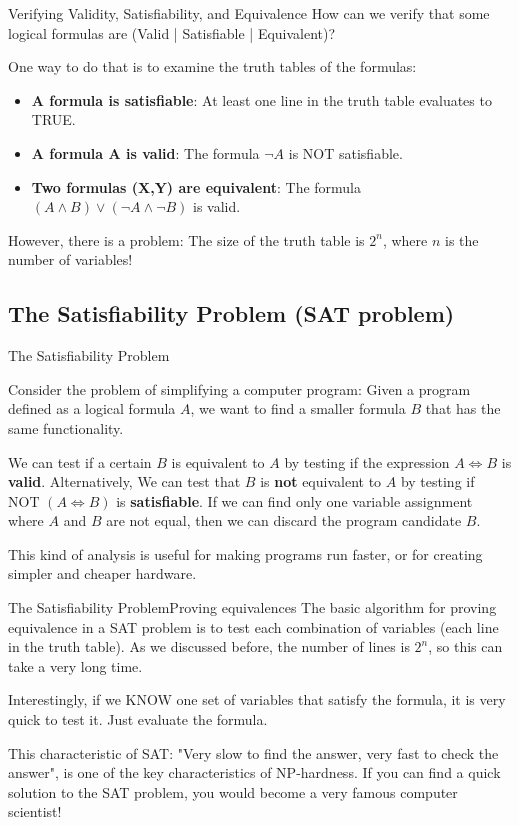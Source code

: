 \begin{frame}[t]{Verifying Validity, Satisfiability, and Equivalence}
  How can we verify that some logical formulas are (Valid | Satisfiable | Equivalent)?\bigskip 

  One way to do that is to examine the truth tables of the formulas:

  \begin{itemize}
    \item {\bf A formula is satisfiable}: At least one line in the truth table evaluates to TRUE.
    \item {\bf A formula A is valid}: The formula $\lnot{A}$ is NOT satisfiable.
    \item {\bf Two formulas (X,Y) are equivalent}: The formula $(A \land B) \lor (\lnot{A}\land\lnot{B})$ is valid.
  \end{itemize}\bigskip

  However, there is a problem: The size of the truth table is $2^n$, where $n$ is the number of variables!
\end{frame}


\subsection{The Satisfiability Problem (SAT problem)}

\begin{frame}{The Satisfiability Problem}

  Consider the problem of simplifying a computer program: Given a program defined as a logical formula $A$, we want to find a smaller formula $B$ that has the same functionality.\vfill

  We can test if a certain $B$ is equivalent to $A$ by testing if the expression $A \iff B$ is {\bf valid}. Alternatively, We can test that $B$ is {\bf not} equivalent to $A$ by testing if $\text{NOT }(A \iff B)$ is {\bf satisfiable}. If we can find only one variable assignment where $A$ and $B$ are not equal, then we can discard the program candidate $B$.\vfill

  This kind of analysis is useful for making programs run faster, or for creating simpler and cheaper hardware.
\end{frame}

\begin{frame}{The Satisfiability Problem}{Proving equivalences}
  The basic algorithm for proving equivalence in a SAT problem is to test each combination of variables (each line in the truth table). As we discussed before, the number of lines is $2^n$, so this can take a very long time.\vfill

  Interestingly, if we KNOW one set of variables that satisfy the formula, it is very quick to test it. Just evaluate the formula.\vfill

  This characteristic of SAT: "Very slow to find the answer, very fast to check the answer", is one of the key characteristics of NP-hardness. If you can find a quick solution to the SAT problem, you would become a very famous computer scientist!
\end{frame}
